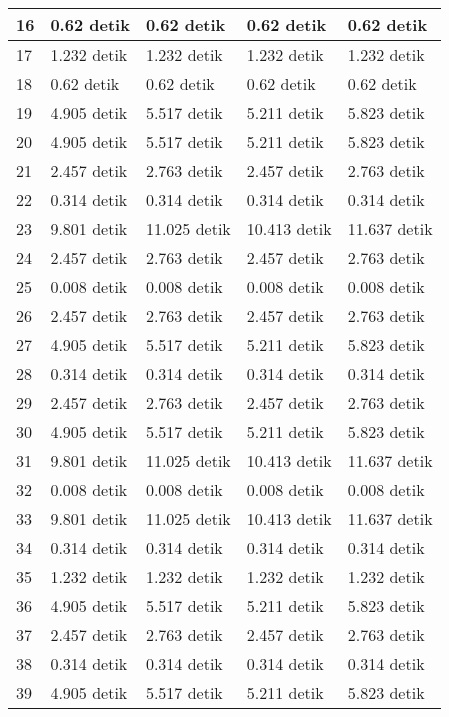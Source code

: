 \begin{table}
\begin{tabular}{| l | l | l | l | l |}
\hline
16 & 0.62 detik & 0.62 detik & 0.62 detik & 0.62 detik \\
\hline
17 & 1.232 detik & 1.232 detik & 1.232 detik & 1.232 detik \\
\hline
18 & 0.62 detik & 0.62 detik & 0.62 detik & 0.62 detik \\
\hline
19 & 4.905 detik & 5.517 detik & 5.211 detik & 5.823 detik \\
\hline
20 & 4.905 detik & 5.517 detik & 5.211 detik & 5.823 detik \\
\hline
21 & 2.457 detik & 2.763 detik & 2.457 detik & 2.763 detik \\
\hline
22 & 0.314 detik & 0.314 detik & 0.314 detik & 0.314 detik \\
\hline
23 & 9.801 detik & 11.025 detik & 10.413 detik & 11.637 detik \\
\hline
24 & 2.457 detik & 2.763 detik & 2.457 detik & 2.763 detik \\
\hline
25 & 0.008 detik & 0.008 detik & 0.008 detik & 0.008 detik \\
\hline
26 & 2.457 detik & 2.763 detik & 2.457 detik & 2.763 detik \\
\hline
27 & 4.905 detik & 5.517 detik & 5.211 detik & 5.823 detik \\
\hline
28 & 0.314 detik & 0.314 detik & 0.314 detik & 0.314 detik \\
\hline
29 & 2.457 detik & 2.763 detik & 2.457 detik & 2.763 detik \\
\hline
30 & 4.905 detik & 5.517 detik & 5.211 detik & 5.823 detik \\
\hline
31 & 9.801 detik & 11.025 detik & 10.413 detik & 11.637 detik \\
\hline
32 & 0.008 detik & 0.008 detik & 0.008 detik & 0.008 detik \\
\hline
33 & 9.801 detik & 11.025 detik & 10.413 detik & 11.637 detik \\
\hline
34 & 0.314 detik & 0.314 detik & 0.314 detik & 0.314 detik \\
\hline
35 & 1.232 detik & 1.232 detik & 1.232 detik & 1.232 detik \\
\hline
36 & 4.905 detik & 5.517 detik & 5.211 detik & 5.823 detik \\
\hline
37 & 2.457 detik & 2.763 detik & 2.457 detik & 2.763 detik \\
\hline
38 & 0.314 detik & 0.314 detik & 0.314 detik & 0.314 detik \\
\hline
39 & 4.905 detik & 5.517 detik & 5.211 detik & 5.823 detik \\
\hline
\end{tabular}
\label{tab:hasilhg4x41}
\end{table}


